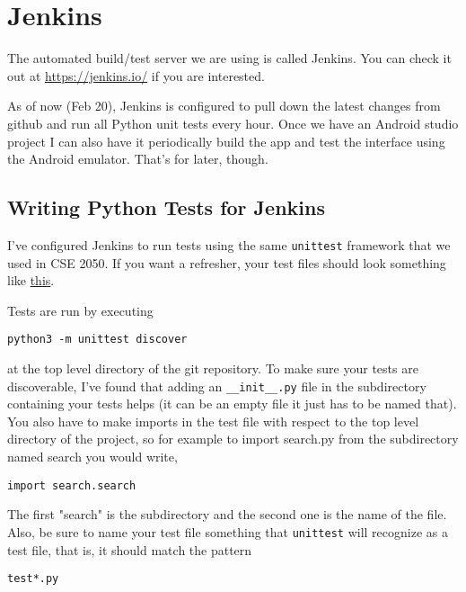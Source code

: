 \documentclass[11pt,letterpaper]{article}
\begin{document}
\section*{Jenkins}
The automated build/test server we are using is called Jenkins. You can check it out at \href{https://jenkins.io/}{https://jenkins.io/} if you are interested. \vspace{1em}

As of now (Feb 20), Jenkins is configured to pull down the latest changes from github and run all Python unit tests every hour. Once we have an Android studio project I can also have it periodically build the app and test the interface using the Android emulator. That's for later, though. 

\subsection*{Writing Python Tests for Jenkins}
I've configured Jenkins to run tests using the same \texttt{unittest} framework that we used in CSE 2050. If you want a refresher, your test files should look something like \href{https://docs.python.org/3/library/unittest.html\#basic-example}{this}. \vspace{1em}

\noindent Tests are run by executing
\begin{verbatim}
python3 -m unittest discover
\end{verbatim}
at the top level directory of the git repository. To make sure your tests are discoverable, I've found that adding an \texttt{\_\_init\_\_.py} file in the subdirectory containing your tests helps (it can be an empty file it just has to be named that). You also have to make imports in the test file with respect to the top level directory of the project, so for example to import search.py from the subdirectory named search you would write,
\begin{verbatim}
import search.search
\end{verbatim}
The first "search" is the subdirectory and the second one is the name of the file. Also, be sure to name your test file something that \texttt{unittest} will recognize as a test file, that is, it should match the pattern \begin{verbatim}
test*.py
\end{verbatim}
\end{document}
